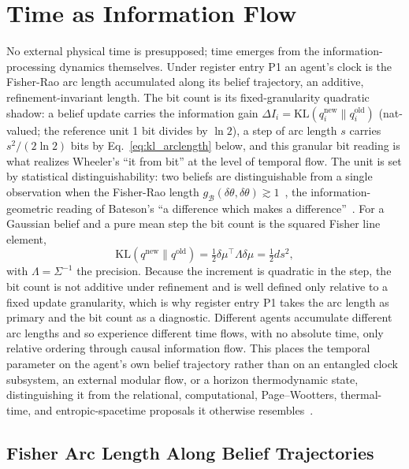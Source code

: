 \documentclass[11pt]{article}
\begin{document}
\section{Time as Information Flow}\label{sec:time_info}

No external physical time is presupposed; time emerges from the information-processing dynamics themselves. Under register entry P1 an agent's clock is the Fisher-Rao arc length accumulated along its belief trajectory, an additive, refinement-invariant length. The bit count is its fixed-granularity quadratic shadow: a belief update carries the information gain $\Delta I_i = \mathrm{KL}(q_i^{\text{new}} \| q_i^{\text{old}})$ (nat-valued; the reference unit 1 bit divides by $\ln 2$), a step of arc length $s$ carries $s^2/(2\ln 2)$ bits by Eq.~\eqref{eq:kl_arclength} below, and this granular bit reading is what realizes Wheeler's ``it from bit'' at the level of temporal flow. The unit is set by statistical distinguishability: two beliefs are distinguishable from a single observation when the Fisher-Rao length $g_{\mathcal{B}}(\delta\theta, \delta\theta) \gtrsim 1$~\cite{CoverThomas2006, AmariNagaoka2000}, the information-geometric reading of Bateson's ``a difference which makes a difference''~\cite{Bateson1972}. For a Gaussian belief and a pure mean step the bit count is the squared Fisher line element,
\begin{equation}
\mathrm{KL}(q^{\text{new}} \| q^{\text{old}}) = \tfrac{1}{2}\delta\mu^\top \Lambda \delta\mu = \tfrac{1}{2}ds^2,
\label{eq:kl_arclength}
\end{equation}
with $\Lambda = \Sigma^{-1}$ the precision. Because the increment is quadratic in the step, the bit count is not additive under refinement and is well defined only relative to a fixed update granularity, which is why register entry P1 takes the arc length as primary and the bit count as a diagnostic. Different agents accumulate different arc lengths and so experience different time flows, with no absolute time, only relative ordering through causal information flow. This places the temporal parameter on the agent's own belief trajectory rather than on an entangled clock subsystem, an external modular flow, or a horizon thermodynamic state, distinguishing it from the relational, computational, Page--Wootters, thermal-time, and entropic-spacetime proposals it otherwise resembles~\cite{Wheeler1990, Lloyd2002, Rovelli2004, PageWootters1983, ConnesRovelli1994, Jacobson1995, VanRaamsdonk2010}.

\subsection{Fisher Arc Length Along Belief Trajectories}
\label{sec:fisher_arc_length}
\end{document}

